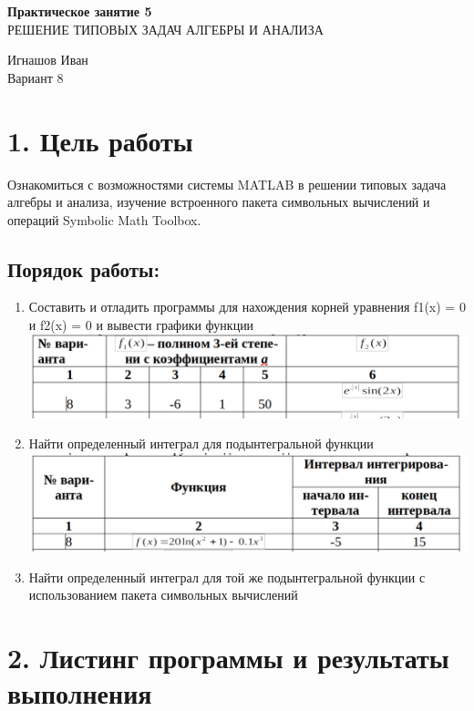 \documentclass[12pt]{article}
\begin{document}
\begin{center}
	\LARGE 
	\textbf{Практическое занятие 5}\\
	РЕШЕНИЕ ТИПОВЫХ ЗАДАЧ АЛГЕБРЫ И АНАЛИЗА\\
\end{center}

\begin{flushright}
	\large
	Игнашов Иван\\
	Вариант 8\\
\end{flushright}

\newpage

 \section*{1. Цель работы}
Ознакомиться с возможностями системы MATLAB в решении типовых задача алгебры и анализа, изучение встроенного пакета символьных вычислений и операций Symbolic Math Toolbox.
\subsection*{Порядок работы:}
\begin{enumerate}
	\item Составить и отладить программы для нахождения корней уравнения f1(x) = 0 и f2(x) = 0 и вывести графики функции\\
		\includegraphics[width=0.75\linewidth]{formula.png}\\
		
	\item Найти определенный интеграл для подынтегральной функции\\
		\includegraphics[width=0.4\linewidth]{formula2.png}
	\item Найти определенный интеграл для той же подынтегральной функции с использованием пакета символьных вычислений\\
\end{enumerate}

\newpage
 \section*{2. Листинг программы и результаты выполнения}%
 
\end{document}
